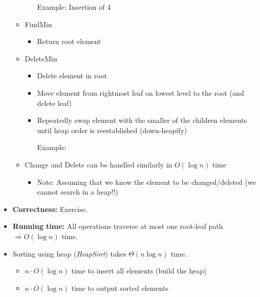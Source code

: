 \documentclass[11pt]{article}
\begin{document}
\begin{itemize}
\begin{itemize}
\begin{itemize}
                Example: Insertion of 4
		
                \end{itemize}
        \item {\sc FindMin}
                \begin{itemize}
                \item Return root element
                \end{itemize}
                
        \item {\sc DeleteMin}
                \begin{itemize}
                \item Delete element in root
                \item Move element from rightmost leaf on lowest level to
                the root (and delete leaf)
                \item Repeatedly swap element with the smaller of the
                children elements until heap order is reestablished
                ({\sc down-heapify})

                \vspace{.5\baselineskip}

                Example: 

                \end{itemize}
        	
\item {\sc Change} and {\sc Delete} can be handled similarly in $O(\log n)$
time
\begin{itemize}
\item Note: Assuming that we know the element to be changed/deleted
(we cannot search in a heap!!)
\end{itemize}
\end{itemize}


\item {\bf Correctness:} Exercise.
\item {\bf Running time:} All operations traverse at most one
root-leaf path $\Rightarrow O(\log n)$ time.


\item Sorting using heap ({\em HeapSort}) takes $\Theta(n\log n)$ time.
  \begin{itemize}
  \item $n\cdot O(\log n)$ time to insert all elements (build the
    heap)
  \item $n\cdot O(\log n)$ time to output sorted elements
  \end{itemize}
  

\end{itemize}
\end{document}
